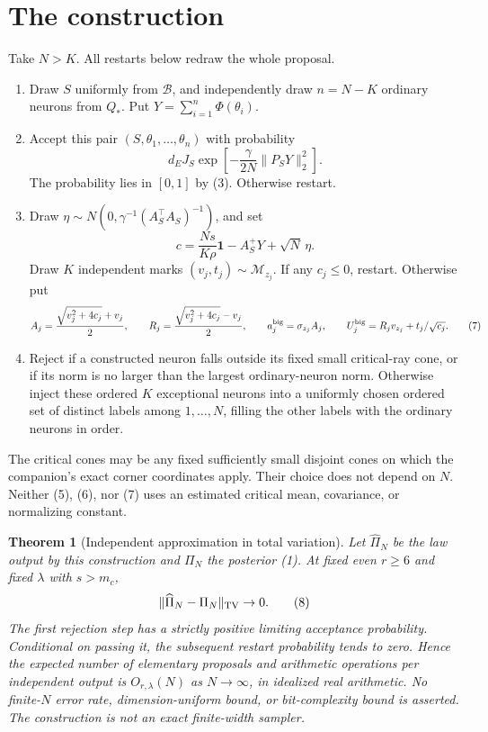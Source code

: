 \documentclass[11pt]{article}
\newtheorem{theorem}{Theorem}\newtheorem{lemma}[theorem]{Lemma}
\newcommand{\one}{\boldsymbol1}
\begin{document}
\section{The construction}
Take $N>K$. All restarts below redraw the whole proposal.
\begin{enumerate}
\item Draw $S$ uniformly from $\mathcal B$, and independently draw
$n=N-K$ ordinary neurons from $Q_*$. Put
$Y=\sum_{i=1}^n\Phi(\theta_i)$.
\item Accept this pair $(S,\theta_1,\ldots,\theta_n)$ with probability
\[
          d_E J_S\exp\left[-\frac\gamma{2N}\|P_SY\|_2^2\right].
 \tag{5}
\]
The probability lies in $[0,1]$ by (3). Otherwise restart.
\item Draw
$\eta\sim N(0,\gamma^{-1}(A_S^\top A_S)^{-1})$, and set
\[
            c=\frac{Ns}{K\rho}\one-A_S^+Y+\sqrt N\,\eta.
 \tag{6}
\]
Draw $K$ independent marks $(v_j,t_j)\sim\mathcal M_{z_j}$.
If any $c_j\le0$, restart. Otherwise put
\[
 A_j=\frac{\sqrt{v_j^2+4c_j}+v_j}{2},\qquad
 R_j=\frac{\sqrt{v_j^2+4c_j}-v_j}{2},\qquad
 a_j^{\rm big}=\sigma_{z_j}A_j,\qquad
 U_j^{\rm big}=R_jv_{z_j}+t_j/\sqrt{c_j}.                \tag{7}
\]
\item Reject if a constructed neuron falls outside its fixed small
critical-ray cone, or if its norm is no larger than the largest
ordinary-neuron norm. Otherwise inject these ordered $K$ exceptional
neurons into a uniformly chosen ordered set of distinct labels among
$1,\ldots,N$, filling the other labels with the ordinary neurons in order.
\end{enumerate}
The critical cones may be any fixed sufficiently small disjoint cones
on which the companion's exact corner coordinates apply. Their choice
does not depend on $N$. Neither (5), (6), nor (7) uses an estimated
critical mean, covariance, or normalizing constant.

\begin{theorem}[Independent approximation in total variation]
Let $\widehat\Pi_N$ be the law output by this construction and $\Pi_N$
the posterior (1). At fixed even $r\ge6$ and fixed $\lambda$ with
$s>m_c$,
\[
                         \|\widehat\Pi_N-\Pi_N\|_{\rm TV}\to0.
 \tag{8}
\]
The first rejection step has a strictly positive limiting acceptance
probability. Conditional on passing it, the subsequent restart
probability tends to zero. Hence the expected number of elementary
proposals and arithmetic operations per independent output is
$O_{r,\lambda}(N)$ as $N\to\infty$, in idealized real arithmetic.
No finite-$N$ error rate, dimension-uniform bound, or bit-complexity
bound is asserted. The construction is not an exact finite-width sampler.
\end{theorem}
\end{document}
